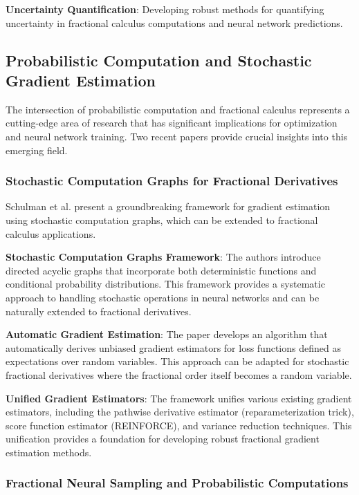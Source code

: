 \textbf{Uncertainty Quantification}: Developing robust methods for quantifying uncertainty in fractional calculus computations and neural network predictions.

\subsection{Probabilistic Computation and Stochastic Gradient Estimation}

The intersection of probabilistic computation and fractional calculus represents a cutting-edge area of research that has significant implications for optimization and neural network training. Two recent papers provide crucial insights into this emerging field.

\subsubsection{Stochastic Computation Graphs for Fractional Derivatives}

Schulman et al. \cite{schulman2015gradient} present a groundbreaking framework for gradient estimation using stochastic computation graphs, which can be extended to fractional calculus applications.

\textbf{Stochastic Computation Graphs Framework}: The authors introduce directed acyclic graphs that incorporate both deterministic functions and conditional probability distributions. This framework provides a systematic approach to handling stochastic operations in neural networks and can be naturally extended to fractional derivatives.

\textbf{Automatic Gradient Estimation}: The paper develops an algorithm that automatically derives unbiased gradient estimators for loss functions defined as expectations over random variables. This approach can be adapted for stochastic fractional derivatives where the fractional order itself becomes a random variable.

\textbf{Unified Gradient Estimators}: The framework unifies various existing gradient estimators, including the pathwise derivative estimator (reparameterization trick), score function estimator (REINFORCE), and variance reduction techniques. This unification provides a foundation for developing robust fractional gradient estimation methods.

\subsubsection{Fractional Neural Sampling and Probabilistic Computations}

